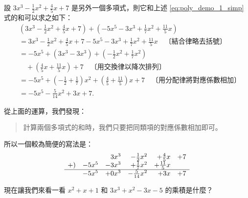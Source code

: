 \begin{example}\label{ex:5-1-3}
設 $3x^3 - \frac{1}{2}x^2 + \frac{4}{5}x + 7$ 是另外一個多項式，則它和上述 \eqref{eq:poly_demo_1_simp} 式的和可以求之如下：
\begin{align*}
  &\left(3x^3 - \frac{1}{2}x^2 + \frac{4}{5}x + 7\right) + \left(-5x^5 - 3x^3 + \frac{1}{7}x^2 + \frac{11}{5}x\right) \\
  &= 3x^3 - \frac{1}{2}x^2 + \frac{4}{5}x + 7 - 5x^5 - 3x^3 + \frac{1}{7}x^2 + \frac{11}{5}x \quad \text{〔結合律略去括號〕} \\
  &= -5x^5 + (3x^3 - 3x^3) + \left(-\frac{1}{2}x^2 + \frac{1}{7}x^2\right) \\
  &\quad + \left(\frac{4}{5}x + \frac{11}{5}x\right) + 7 \quad \text{〔用交換律以降次排列〕} \\
  &= -5x^5 + \left(-\frac{1}{2} + \frac{1}{7}\right)x^2 + \left(\frac{4}{5} + \frac{11}{5}\right)x + 7 \quad \text{〔用分配律將對應係數相加〕} \\
  &= -5x^5 - \frac{5}{14}x^2 + 3x + 7.
\end{align*}
\end{example}

從上面的運算，我們發現：
\begin{quote}
計算兩個多項式的和時，我們只要把同類項的對應係數相加即可。
\end{quote}
所以一個較為簡便的寫法是：
\begin{equation*}
\begin{array}{rrrrrr}
  &  & 3x^3 & -\frac{1}{2}x^2 & +\frac{4}{5}x & +7 \\
+) & -5x^5 & -3x^3 & +\frac{1}{7}x^2 & +\frac{11}{5}x & \\ \hline
  & -5x^5 & +0x^3 & -\frac{5}{14}x^2 & +3x & +7
\end{array}
\end{equation*}

\begin{example}\label{ex:5-1-4}
現在讓我們來看一看 $x^2+x+1$ 和 $3x^3+x^2-3x-5$ 的乘積是什麼？
\end{example}

